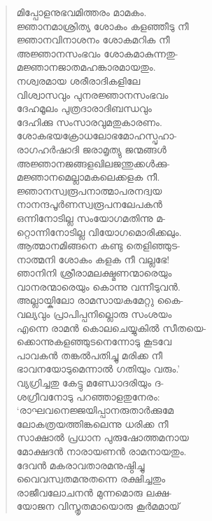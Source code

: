 \begin{verse}
മിപ്പോളനുഭവമിത്തരം മാമകം.\\
ജ്ഞാനമാശ്രിത്യ ശോകം കളഞ്ഞീടു നീ\\
ജ്ഞാനവിനാശനം ശോകമറിക നീ\\
അജ്ഞാനസംഭവം ശോകമാകുന്നതു-\\
മജ്ഞാനജാതമഹങ്കാരമായതും.\\
നശ്വരമായ ശരീരാദികളിലേ\\
വിശ്വാസവും പുനരജ്ഞാനസംഭവം\\
ദേഹമൂലം പുത്രദാരാദിബന്ധവും\\
ദേഹിക്കു സംസാരവുമതുകാരണം.\\
ശോകഭയക്രോധലോഭമോഹസ്പൃഹാ-\\
രാഗഹര്‍ഷാദി ജരാമൃത്യു ജന്മങ്ങള്‍\\
അജ്ഞാനജങ്ങളഖിലജന്തുക്കള്‍ക്കു-\\
മജ്ഞാനമെല്ലാമകലെക്കളക നീ.\\
ജ്ഞാനസ്വരൂപനാത്മാപരനദ്വയ\\
നാനന്ദപൂര്‍ണസ്വരൂപനലേപകന്‍\\
ഒന്നിനോടില്ല സംയോഗമതിന്നു മ-\\
റ്റൊന്നിനോടില്ല വിയോഗമൊരിക്കലും.\\
ആത്മാനമിങ്ങനെ കണ്ടു തെളിഞ്ഞുട-\\
നാത്മനി ശോകം കളക നീ വല്ലഭേ!\\
ഞാനിനി ശ്രീരാമലക്ഷ്മണന്മാരെയും\\
വാനരന്മാരെയും കൊന്നു വന്നീടുവന്‍.\\
അല്ലായ്കിലോ രാമസായകമേറ്റു കൈ-\\
വല്യവും പ്രാപിപ്പനില്ലൊരു സംശയം\\
എന്നെ രാമന്‍ കൊലചെയ്യുകില്‍ സീതയെ-\\
ക്കൊന്നുകളഞ്ഞുടനെന്നോടു കൂടവേ\\
പാവകന്‍ തങ്കല്‍പതിച്ചു മരിക്ക നീ\\
ഭാവനയോടുമെന്നാല്‍ ഗതിയും വരും.’\\
വ്യഗ്രിച്ചതു കേട്ടു മണ്ഡോദരിയും ദ-\\
ശഗ്രീവനോടു പറഞ്ഞാളതുനേരം:\\
‘രാഘവനെജ്ജയിപ്പാനരുതാര്‍ക്കുമേ\\
ലോകത്രയത്തിങ്കലെന്നു ധരിക്ക നീ\\
സാക്ഷാല്‍ പ്രധാന പുരുഷോത്തമനായ\\
മോക്ഷദന്‍ നാരായണന്‍ രാമനായതും.\\
ദേവന്‍ മകരാവതാരമനുഷ്ഠിച്ചു\\
വൈവസ്വതമനുതന്നെ രക്ഷിച്ചതും\\
രാജീവലോചനന്‍ മുന്നമൊരു ലക്ഷ-\\
യോജന വിസ്തൃതമായൊരു കൂര്‍മമായ്\\

\end{verse}
